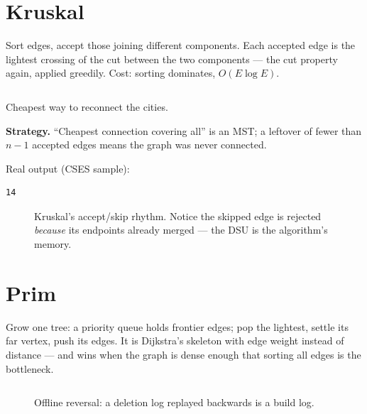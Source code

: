 \section{Kruskal}\label{sec:kruskal}
Sort edges, accept those joining different components. Each accepted
edge is the lightest crossing of the cut between the two components
--- the cut property again, applied greedily. Cost: sorting
dominates, $O(E\log E)$.
\begin{lstlisting}[language=C++,caption={\texttt{kruskal.h} on top of
\texttt{DSU}.},label={lst:kruskal}]
\end{lstlisting}

\begin{example}\label{ex:reparation}
Cheapest way to reconnect the cities.
\par\smallskip
\textbf{Strategy.} ``Cheapest connection covering all'' is an MST;
a leftover of fewer than $n{-}1$ accepted edges means the graph was
never connected.
\par\smallskip
\begin{solution}

Real output (CSES sample):
\begin{lstlisting}[numbers=none]
14
\end{lstlisting}
\end{solution}
\end{example}
\begin{figure}[ht]\centering

\caption{Kruskal's accept/skip rhythm. Notice the skipped edge is
rejected \emph{because} its endpoints already merged --- the DSU is
the algorithm's memory.}
\label{fig:kruskal}
\end{figure}

\section{Prim}\label{sec:prim}
Grow one tree: a priority queue holds frontier edges; pop the
lightest, settle its far vertex, push its edges. It is Dijkstra's
skeleton with edge weight instead of distance --- and wins when the
graph is dense enough that sorting all edges is the bottleneck.
\begin{lstlisting}[language=C++,caption={\texttt{prim.h}: the pq
frontier.},label={lst:prim}]
\end{lstlisting}



\begin{figure}[htbp]\centering

\caption{Offline reversal: a deletion log replayed backwards is a build log.}
\label{fig:reverse}
\end{figure}

